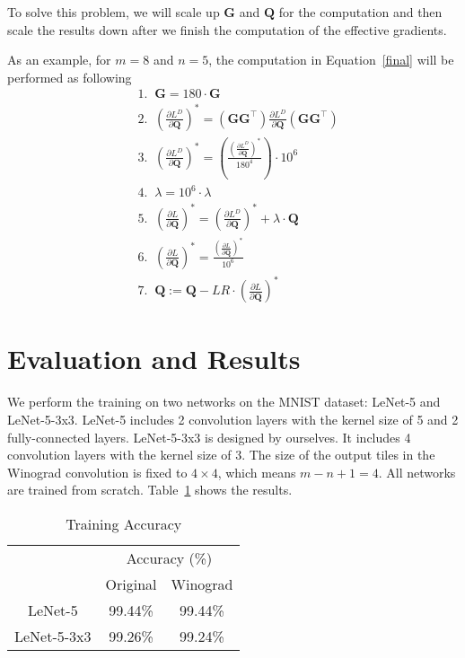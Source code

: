 \documentclass[12pt]{article} %
\begin{document}
To solve this problem, we will scale up $\boldsymbol{G}$ and $\boldsymbol{Q}$ for the computation and then scale the results down after we finish the computation of the effective gradients.

As an example, for $m = 8$ and $n = 5$, the computation in Equation~\ref{final} will be performed as following
\begin{equation}
\begin{aligned}
	&1.\;\; \boldsymbol{G} = 180 \cdot \boldsymbol{G} \\
	&2.\;\; (\frac{\partial L^D}{\partial \boldsymbol{Q}})^* = (\boldsymbol{G} \boldsymbol{G}^{\top})\frac{\partial L^D}{\partial \boldsymbol{Q}}(\boldsymbol{G} \boldsymbol{G}^{\top}) \\
	&3.\;\; (\frac{\partial L^D}{\partial \boldsymbol{Q}})^* = (\frac{(\frac{\partial L^D}{\partial \boldsymbol{Q}})^*}{180^4}) \cdot 10^6\\
	&4.\;\; \lambda = 10^6 \cdot \lambda \\
	&5.\;\; (\frac{\partial L}{\partial \boldsymbol{Q}})^* = (\frac{\partial L^D}{\partial \boldsymbol{Q}})^* + \lambda \cdot \boldsymbol{Q} \\
	&6.\;\; (\frac{\partial L}{\partial \boldsymbol{Q}})^* = \frac{(\frac{\partial L}{\partial \boldsymbol{Q}})^*}{10^6} \\
	&7.\;\; \boldsymbol{Q} := \boldsymbol{Q} - LR \cdot (\frac{\partial L}{\partial \boldsymbol{Q}})^*
\end{aligned}
\end{equation}
\fi

\clearpage

\section{Evaluation and Results}
We perform the training on two networks on the MNIST dataset: LeNet-5 and LeNet-5-3x3. LeNet-5 includes 2 convolution layers with the kernel size of 5 and 2 fully-connected layers. LeNet-5-3x3 is designed by ourselves. It includes 4 convolution layers with the kernel size of 3. The size of the output tiles in the Winograd convolution is fixed to $4 \times 4$, which means $m - n + 1 = 4$. All networks are trained from scratch. Table~\ref{acc} shows the results.
\begin{table}[h]
\centering
\caption{Training Accuracy}
\label{acc}
\begin{tabular}{|c|c|c|}
\hline
\multirow{2}{*}{} & \multicolumn{2}{c|}{Accuracy (\%)} \\ \cline{2-3} 
                  & Original         & Winograd        \\ \hline
LeNet-5           & 99.44\%          & 99.44\%         \\ \hline
LeNet-5-3x3       & 99.26\%          & 99.24\%         \\ \hline
\end{tabular}
\end{table}
\clearpage
\end{document}
